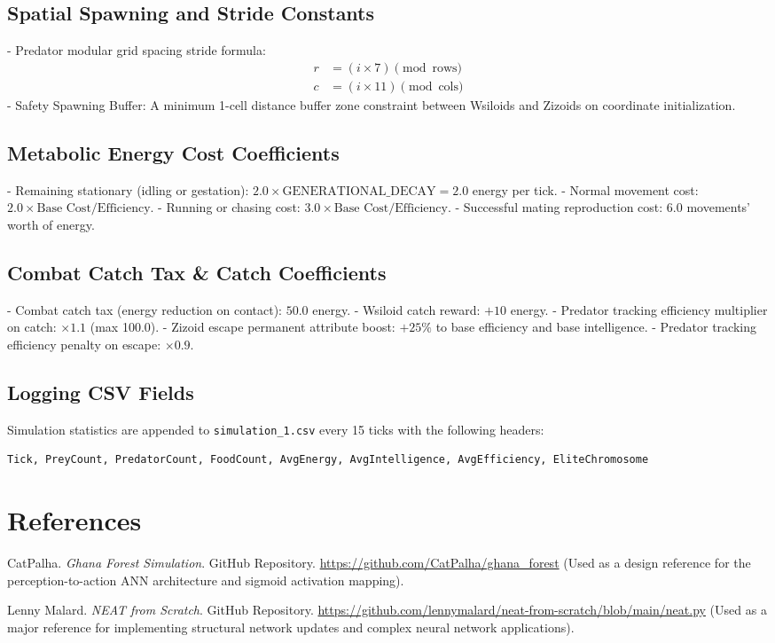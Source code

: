 \documentclass[11pt,a4paper]{article}
\begin{document}
\subsection{Spatial Spawning and Stride Constants}
- Predator modular grid spacing stride formula:
  \begin{align}
      r &= (i \times 7) \pmod{\text{rows}} \\
      c &= (i \times 11) \pmod{\text{cols}}
  \end{align}
- Safety Spawning Buffer: A minimum 1-cell distance buffer zone constraint between Wsiloids and Zizoids on coordinate initialization.

\subsection{Metabolic Energy Cost Coefficients}
- Remaining stationary (idling or gestation): $2.0 \times \text{GENERATIONAL\_DECAY} = 2.0$ energy per tick.
- Normal movement cost: $2.0 \times \text{Base Cost} / \text{Efficiency}$.
- Running or chasing cost: $3.0 \times \text{Base Cost} / \text{Efficiency}$.
- Successful mating reproduction cost: $6.0$ movements' worth of energy.

\subsection{Combat Catch Tax \& Catch Coefficients}
- Combat catch tax (energy reduction on contact): $50.0$ energy.
- Wsiloid catch reward: $+10$ energy.
- Predator tracking efficiency multiplier on catch: $\times 1.1$ (max 100.0).
- Zizoid escape permanent attribute boost: $+25\%$ to base efficiency and base intelligence.
- Predator tracking efficiency penalty on escape: $\times 0.9$.

\subsection{Logging CSV Fields}
Simulation statistics are appended to \texttt{simulation\_1.csv} every 15 ticks with the following headers:
\begin{lstlisting}[language=bash]
Tick, PreyCount, PredatorCount, FoodCount, AvgEnergy, AvgIntelligence, AvgEfficiency, EliteChromosome
\end{lstlisting}

\section{References}
\begin{thebibliography}{9}
CatPalha. \textit{Ghana Forest Simulation}. GitHub Repository. \url{https://github.com/CatPalha/ghana_forest} (Used as a design reference for the perception-to-action ANN architecture and sigmoid activation mapping).

Lenny Malard. \textit{NEAT from Scratch}. GitHub Repository. \url{https://github.com/lennymalard/neat-from-scratch/blob/main/neat.py} (Used as a major reference for implementing structural network updates and complex neural network applications).
\end{thebibliography}
\end{document}
